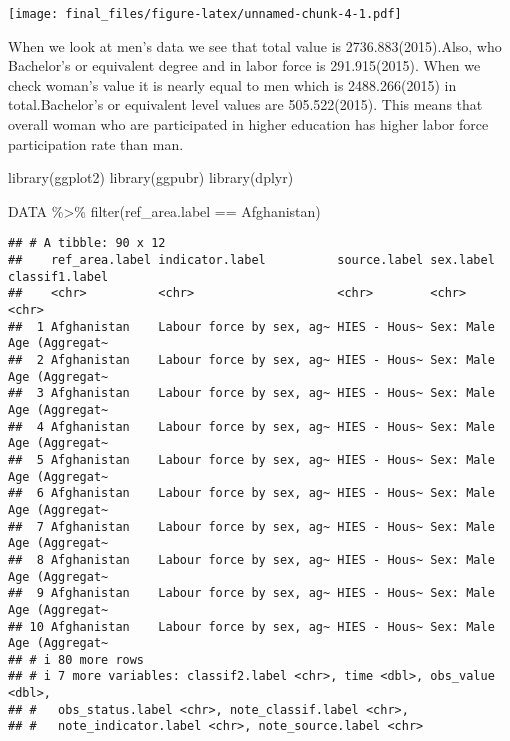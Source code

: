 \documentclass[
  12pt,
]{article}
\newenvironment{Shaded}{\begin{snugshade}}{\end{snugshade}}
\newcommand{\FunctionTok}[1]{\textcolor[rgb]{0.00,0.00,0.00}{#1}}
\newcommand{\NormalTok}[1]{#1}
\newcommand{\SpecialCharTok}[1]{\textcolor[rgb]{0.00,0.00,0.00}{#1}}
\newcommand{\StringTok}[1]{\textcolor[rgb]{0.31,0.60,0.02}{#1}}
\begin{document}
\texttt{[image: final\_files/figure-latex/unnamed-chunk-4-1.pdf]}

When we look at men's data we see that total value is 2736.883(2015).Also, who Bachelor's or equivalent degree and in labor force is 291.915(2015). When we check woman's value it is nearly equal to men which is 2488.266(2015) in total.Bachelor's or equivalent level values are 505.522(2015). This means that overall woman who are participated in higher education has higher labor force participation rate than man.

\begin{Shaded}
\begin{Highlighting}[]
\FunctionTok{library}\NormalTok{(ggplot2)}
\FunctionTok{library}\NormalTok{(ggpubr)}
\FunctionTok{library}\NormalTok{(dplyr)}

\NormalTok{DATA }\SpecialCharTok{\%\textgreater{}\%} \FunctionTok{filter}\NormalTok{(ref\_area.label }\SpecialCharTok{==} \StringTok{\textquotesingle{}Afghanistan\textquotesingle{}}\NormalTok{)}
\end{Highlighting}
\end{Shaded}

\begin{verbatim}
## # A tibble: 90 x 12
##    ref_area.label indicator.label          source.label sex.label classif1.label
##    <chr>          <chr>                    <chr>        <chr>     <chr>         
##  1 Afghanistan    Labour force by sex, ag~ HIES - Hous~ Sex: Male Age (Aggregat~
##  2 Afghanistan    Labour force by sex, ag~ HIES - Hous~ Sex: Male Age (Aggregat~
##  3 Afghanistan    Labour force by sex, ag~ HIES - Hous~ Sex: Male Age (Aggregat~
##  4 Afghanistan    Labour force by sex, ag~ HIES - Hous~ Sex: Male Age (Aggregat~
##  5 Afghanistan    Labour force by sex, ag~ HIES - Hous~ Sex: Male Age (Aggregat~
##  6 Afghanistan    Labour force by sex, ag~ HIES - Hous~ Sex: Male Age (Aggregat~
##  7 Afghanistan    Labour force by sex, ag~ HIES - Hous~ Sex: Male Age (Aggregat~
##  8 Afghanistan    Labour force by sex, ag~ HIES - Hous~ Sex: Male Age (Aggregat~
##  9 Afghanistan    Labour force by sex, ag~ HIES - Hous~ Sex: Male Age (Aggregat~
## 10 Afghanistan    Labour force by sex, ag~ HIES - Hous~ Sex: Male Age (Aggregat~
## # i 80 more rows
## # i 7 more variables: classif2.label <chr>, time <dbl>, obs_value <dbl>,
## #   obs_status.label <chr>, note_classif.label <chr>,
## #   note_indicator.label <chr>, note_source.label <chr>
\end{verbatim}
\end{document}
